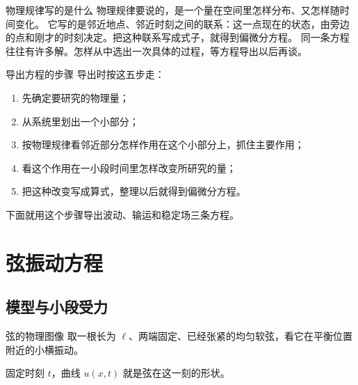 \documentclass[fontset=windows, chinese, 10pt, xcolor=dvipsnames]{beamer}
\begin{document}
\begin{frame}{物理规律写的是什么}
  物理规律要说的，是一个量在空间里怎样分布、又怎样随时间变化。
  \vspace{0.4em}
  它写的是邻近地点、邻近时刻之间的联系：这一点现在的状态，由旁边的点和刚才的时刻决定。把这种联系写成式子，就得到偏微分方程。
  \vspace{0.35em}
  同一条方程往往有许多解。怎样从中选出一次具体的过程，等方程导出以后再谈。
\end{frame}

\begin{frame}{导出方程的步骤}
  导出时按这五步走：
  \begin{enumerate}
    \item 先确定要研究的物理量；
    \item 从系统里划出一个小部分；
    \item 按物理规律看邻近部分怎样作用在这个小部分上，抓住主要作用；
    \item 看这个作用在一小段时间里怎样改变所研究的量；
    \item 把这种改变写成算式，整理以后就得到偏微分方程。
  \end{enumerate}
  \vspace{0.3em}
  下面就用这个步骤导出波动、输运和稳定场三条方程。
\end{frame}

\section{弦振动方程}

\subsection{模型与小段受力}

\begin{frame}{弦的物理图像}
  取一根长为 $\ell$、两端固定、已经张紧的均匀软弦，看它在平衡位置附近的小横振动。
  \begin{center}
  \end{center}
  固定时刻 $t$，曲线 $u(x,t)$ 就是弦在这一刻的形状。
\end{frame}
\end{document}
